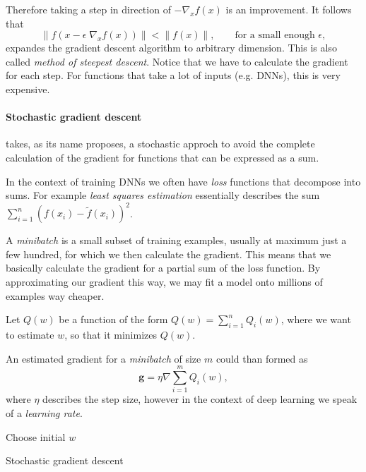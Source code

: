 Therefore taking a step in direction of \(-\nabla_x f(x)\) is an improvement.
It follows that
\begin{equation}
    \lVert f(x - \epsilon \; \nabla_x f(x)) \rVert < \lVert f(x) \rVert, \qquad \text{for a small enough } \epsilon,
\end{equation}
expandes the gradient descent algorithm to arbitrary dimension. This is also called \emph{method of steepest descent}.
Notice that we have to calculate the gradient for each step.
For functions that take a lot of inputs (e.g. DNNs), this is very expensive.

\paragraph{Stochastic gradient descent} takes, as its name proposes, a stochastic approch to avoid the complete calculation of the gradient for functions that can be expressed as a sum.

In the context of training DNNs we often have \emph{loss} functions that decompose into sums.
For example \emph{least squares estimation} essentially describes the sum \(\sum^{n}_{i = 1} (f(x_i) - \tilde{f}(x_i))^2\).

A \emph{minibatch} is a small subset of training examples, usually at maximum just a few hundred, for which we then calculate the gradient.
This means that we basically calculate the gradient for a partial sum of the loss function.
By approximating our gradient this way, we may fit a model onto millions of examples way cheaper. 

Let \(Q(w)\) be a function of the form \(Q(w) = \sum^{n}_{i = 1} Q_i(w)\), where we want to estimate \(w\), so that it minimizes \(Q(w)\).

An estimated gradient for a \emph{minibatch} of size \(m\) could than formed as
\begin{equation}
    \boldsymbol{g} = \eta \nabla \sum^{m}_{i = 1} Q_i(w),
\end{equation}
where \(\eta\) describes the step size, however in the context of deep learning we speak of a \emph{learning rate}.

\begin{algorithm}[H]
    \BlankLine
    Choose initial $w$\;
    \caption{Stochastic gradient descent}
\end{algorithm}